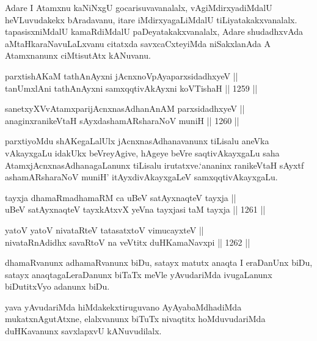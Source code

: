 \begin{artha}
Adare I Atamxnu kaNiNxgU gocarisuvavanalalx, vAgiMdirxyadiMdalU heVLuvudakekx bAradavanu, itare iMdirxyagaLiMdalU tiLiyatakakxvanalalx. tapasisxniMdalU kamaRdiMdalU paDeyatakakxvanalalx, Adare shudadhxvAda aMtaHkaraNavuLaLxvanu citatxda savxcaCxteyiMda niSakxlanAda A Atamxnanunx ciMtisutAtx kANuvanu.
\end{artha}

\begin{shl}
parxtishAKaM tathA\s nAyxni jAcnxnoVpAyaparxsidadhxyeV || \\
tanUmxlAni tathA\s nAyxni samxqqtivAkAyxni koVTishaH \hfill || 1259 ||  
\end{shl}
				
\begin{shl}
sanetxyXVvA\s \s tamxparijAcnxnasAdhanAnAM parxsidadhxyeV || \\
anaginxranikeVtaH sAyxdashamAR\s sharaNoV muniH \hfill || 1260 ||  
\end{shl}

\begin{artha}
parxtiyoMdu shAKegaLalUlx jAcnxnasAdhanavanunx tiLisalu aneVka vAkayxgaLu idakUkx beVreyAgive, hAgeye beVre saqtivAkayxgaLu saha AtamxjAcnxnasAdhanagaLanunx tiLisalu irutatxve.`ananinx ranikeVtaH sAyxtf ashamAR\s sharaNoV muniH' itAyxdivAkayxgaLeV samxqqtivAkayxgaLu.
\end{artha}


\begin{shl}
tayxja dhamaRmadhamaRM ca uBeV satAyxnaqteV tayxja || \\
uBeV satAyxnaqteV tayxkAtxvX yeVna tayxjasi taM tayxja \hfill || 1261 ||  
\end{shl}
				
\begin{shl}
yatoV yatoV nivataRteV tatasatxtoV vimucayxteV || \\
nivataRnAdidhx savaRtoV na veVtitx duHKamaNavxpi \hfill || 1262 ||  
\end{shl}

\begin{artha}
dhamaRvanunx adhamaRvanunx biDu, satayx matutx anaqta I eraDanUnx biDu, satayx anaqtagaLeraDanunx biTaTx meVle yAvudariMda ivugaLanunx biDutitxVyo adanunx biDu.
\end{artha}

\begin{artha}
yava yAvudariMda hiMdakekxtiruguvano AyAyabaMdhadiMda mukatxnAgutAtxne, elalxvanunx biTuTx nivaqtitx hoMduvudariMda duHKavanunx savxlapxvU kANuvudilalx.
\end{artha}

